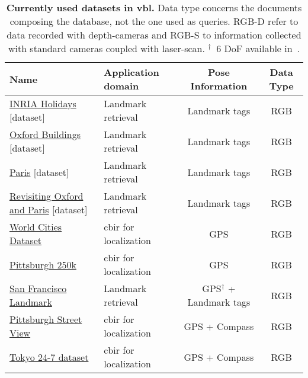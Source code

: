 \begin{landscape}
\begin{table}
	\centering
	\caption[Currently used datasets in \ac{vbl}]{\label{tab:dataset} \textbf{Currently used datasets in \ac{vbl}.} Data type concerns the documents composing the database, not the one used as queries. RGB-D refer to data recorded with depth-cameras and RGB-S to information collected with standard cameras coupled with laser-scan. $^{\dagger}$~6 DoF available in~\citep{Sattler2017}.}
	\renewcommand{\arraystretch}{1.1}
	\footnotesize{
		\begin{tabular}{l  l  c  c}
      		\hline
			\bf Name		& \bf Application domain	& \bf Pose Information		& 	\bf Data Type  \\
      		\hline
      		\hline
			\href{http://lear.inrialpes.fr/people/jegou/data.php\#holidays}{INRIA Holidays} [dataset]\citep{Jegou2008} & Landmark retrieval & Landmark tags & RGB \\
			\href{http://www.robots.ox.ac.uk/~vgg/data/oxbuildings/}{Oxford Buildings} [dataset]\citep{Philbin2007} & Landmark retrieval & Landmark tags & RGB \\
			\href{http://www.robots.ox.ac.uk/~vgg/data/parisbuildings/}{Paris} [dataset]\citep{Philbin2008} & Landmark retrieval  & Landmark tags & RGB \\
			\href{cmp.felk.cvut.cz/revisitop}{Revisiting Oxford and Paris} [dataset]\citep{Radenovic2018} & Landmark retrieval  & Landmark tags & RGB \\
			\href{http://image.ntua.gr/iva/datasets/wc/}{World Cities Dataset} \citep{Tolias2011} & \ac{cbir} for localization & GPS & RGB \\
            \href{http://www.ok.ctrl.titech.ac.jp/~torii/project/repttile/}{Pittsburgh 250k} \citep{Torii2013} & \ac{cbir} for localization & GPS & RGB \\
            \href{https://purl.stanford.edu/vn158kj2087}{San Francisco Landmark} \citep{Chen2011} & Landmark retrieval & GPS$^{\dagger}$ + Landmark tags & RGB \\[3pt]

			\href{http://crcv.ucf.edu/projects/GMCP_Geolocalization/}{Pittsburgh Street View} \citep{Zamir2014} & \ac{cbir} for localization & GPS + Compass & RGB \\
			\href{http://www.ok.ctrl.titech.ac.jp/~torii/project/247/}{Tokyo 24-7 dataset} \citep{Torii2015} & \ac{cbir} for localization & GPS + Compass & RGB \\[3pt]


\end{tabular}}
\end{table}
\end{landscape}
